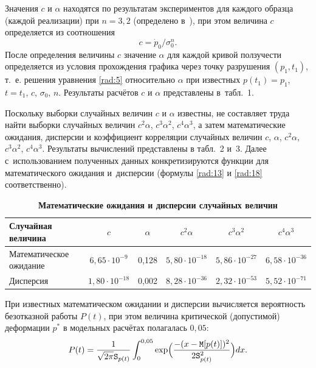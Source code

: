Значения $c$ и $\alpha$ находятся по результатам экспериментов для каждого образца (каждой реализации) при $n=3,2$ (определено в~\cite{rad:bib:24}), при этом величина $c$ определяется из соотношения
\begin{equation}
c={\dot{p}_0}/{\sigma_0^n}.
\label{rad:19}
\end{equation}
После определения величины $c$ значение $\alpha$ для каждой кривой ползучести определяется из условия прохождения графика через точку разрушения $(p_1, t_1)$, т.~е. решения уравнения \eqref{rad:5} относительно $\alpha$ при известных $p(t_1)=p_1$, $t=t_1$, $c$, $\sigma_0$, $n$.
Результаты расчётов $c$ и $\alpha$ представлены в~табл.~1.

Поскольку выборки случайных величин $c$ и $\alpha$ известны, не  составляет труда найти выборки случайных величин $c^2\alpha$, $c^3\alpha^2$, $c^4\alpha^3$, а затем математические ожидания, дисперсии и коэффициент корреляции случайных величин $c$, $\alpha$, $c^2\alpha$, $c^3\alpha^2$, $c^4\alpha^3$. Результаты вычислений представлены в табл.~2 и~3. 
Далее с~использованием полученных данных конкретизируются функции для математического ожидания и~дисперсии (формулы \eqref{rad:13} и \eqref{rad:18} соответственно).

\begin{table}[b!]
\small \setlength{\tabcolsep}{2.5pt}
\caption{\bf Математические ожидания и дисперсии случайных величин}\vspace{-3mm}
\begin{tabular}{l|c|c|c|c|c}
\hline Случайная величина & $c$ & $\alpha$ & $c^2\alpha$ & $c^3\alpha^2$ & $c^4\alpha^3$ \\ 
\hline
Математическое ожидание & $6,65\cdot 10^{-9}$ & 0,128 & $5,80\cdot 10^{-18}$ & $5,86\cdot 10^{-27}$ & $6,58\cdot 10^{-36}$ \\
\hline
Дисперсия & $1,80\cdot 10^{-18}$ & 0,002 & $8,28\cdot 10^{-36}$ & $2,32\cdot 10^{-53}$ & $5,52\cdot 10^{-71}$\\
\hline
\end{tabular} 
\end{table}



При известных математическом ожидании и дисперсии вычисляется вероятность безотказной работы $P(t)$, при этом величина критической (допустимой) деформации $p^\ast$ в модельных расчётах полагалась $0,05$:
\begin{equation}
P(t)=\frac{1}{\sqrt{2\pi}{\tt S}_{p(t)}}\int_{0}^{0,05}\exp \Bigl({\frac{-(x-{\tt M}[p(t)])^2}{2{\tt S}^2_{p(t)}}} \Bigr)dx.
\label{rad:20}
\end{equation}

